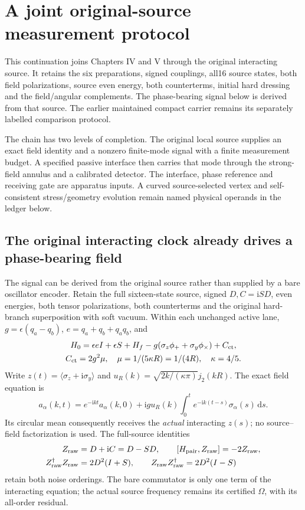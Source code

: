 \documentclass[10pt,twocolumn,letterpaper]{article}
\newcommand{\dd}{\mathrm{d}}
\begin{document}
\clearpage
\section{A joint original-source measurement protocol}
\label{sec:joint-measurement}
This continuation joins Chapters IV and V through the original interacting
source. It retains the six preparations, signed couplings, all16 source
states, both field polarizations, source even energy, both counterterms,
initial hard dressing and the field/angular complements. The phase-bearing
signal below is derived from that source. The earlier maintained compact
carrier remains its separately labelled comparison protocol.

The chain has two levels of completion. The original local source supplies
an exact field identity and a nonzero finite-mode signal with a finite
measurement budget. A specified passive interface then carries that mode
through the strong-field annulus and a calibrated detector. The interface,
phase reference and receiving gate are apparatus inputs. A curved
source-selected vertex and self-consistent stress/geometry evolution
remain named physical operands in the ledger below.
\subsection{The original interacting clock already drives a phase-bearing field}
The signal can be derived from the original source rather than supplied by
a bare oscillator encoder. Retain the full sixteen-state source, signed
$D,C=\mathrm{i}SD$, even energies, both tensor polarizations, both
counterterms and the original hard-branch superposition with soft vacuum.
Within each unchanged active lane, $g=\epsilon(q_a-q_b)$,
$e=q_a+q_b+q_aq_b$, and
\[
 \begin{gathered}
 H_0=\epsilon e I+\epsilon S+H_f
       -g(\sigma_z\phi_++\sigma_y\phi_\times)+C_{\rm ct},\\
 C_{\rm ct}=2g^2\mu,\quad
 \mu=1/(5\kappa R)=1/(4R),\quad\kappa=4/5.
 \end{gathered}
\]
Write $z(t)=\langle\sigma_z+\mathrm{i}\sigma_y\rangle$ and
$u_R(k)=\sqrt{2k/(\kappa\pi)}j_2(kR)$. The exact field equation is
\[
 a_\alpha(k,t)=e^{-\mathrm{i}kt}a_\alpha(k,0)
     +\mathrm{i}g u_R(k)\int_0^t
            e^{-\mathrm{i}k(t-s)}\sigma_\alpha(s)\,\dd s.
\]
Its circular mean consequently receives the \emph{actual} interacting
$z(s)$; no source--field factorization is used. The full-source identities
\[
 \begin{split}
 Z_{\rm raw}&=D+\mathrm{i}C=D-SD,\qquad
 [H_{\rm pair},Z_{\rm raw}]=-2Z_{\rm raw},\\
 Z_{\rm raw}^\dagger Z_{\rm raw}&=2D^2(I+S),\qquad
 Z_{\rm raw}Z_{\rm raw}^\dagger=2D^2(I-S)
 \end{split}
\]
retain both noise orderings. The bare commutator is only one term of the
interacting equation; the actual source frequency remains its certified
$\Omega$, with its all-order residual.
\end{document}
